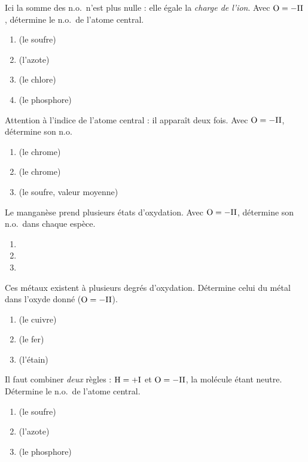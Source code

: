 \documentclass[11pt,a4paper]{article}
\begin{document}
\begin{exo}
Ici la somme des n.o.\ n'est plus nulle : elle égale la \emph{charge de l'ion}. Avec $\ce{O}=-\mathrm{II}$,
détermine le n.o.\ de l'atome central.
\begin{enumerate}[label=\alph*)]
  \item {} (le soufre)
  \item {} (l'azote)
  \item {} (le chlore)
  \item {} (le phosphore)
\end{enumerate}
\end{exo}

\begin{exo}
Attention à l'indice de l'atome central : il apparaît deux fois. Avec $\ce{O}=-\mathrm{II}$, détermine son n.o.
\begin{enumerate}[label=\alph*)]
  \item {} (le chrome)
  \item {} (le chrome)
  \item {} (le soufre, valeur moyenne)
\end{enumerate}
\end{exo}

\begin{exo}
Le manganèse prend plusieurs états d'oxydation. Avec $\ce{O}=-\mathrm{II}$, détermine son n.o.\ dans chaque
espèce.
\begin{enumerate}[label=\alph*)]
  \item {}
  \item {}
  \item {}
\end{enumerate}
\end{exo}

\begin{exo}
Ces métaux existent à plusieurs degrés d'oxydation. Détermine celui du métal dans l'oxyde donné
($\ce{O}=-\mathrm{II}$).
\begin{enumerate}[label=\alph*)]
  \item {} (le cuivre)
  \item {} (le fer)
  \item {} (l'étain)
\end{enumerate}
\end{exo}

\begin{exo}
Il faut combiner \emph{deux} règles : $\ce{H}=+\mathrm{I}$ et $\ce{O}=-\mathrm{II}$, la molécule étant neutre.
Détermine le n.o.\ de l'atome central.
\begin{enumerate}[label=\alph*)]
  \item {} (le soufre)
  \item {} (l'azote)
  \item {} (le phosphore)
\end{enumerate}
\end{exo}
\end{document}
